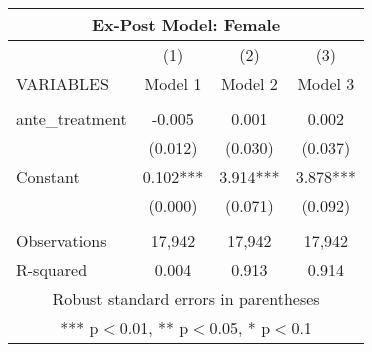 \begin{tabular}{lccc}
\multicolumn{4}{c}{Ex-Post Model: Female} \\ \hline
 & (1) & (2) & (3) \\
VARIABLES & Model 1 & Model 2 & Model 3 \\ \hline
 &  &  &  \\
ante\_treatment & -0.005 & 0.001 & 0.002 \\
 & (0.012) & (0.030) & (0.037) \\
Constant & 0.102*** & 3.914*** & 3.878*** \\
 & (0.000) & (0.071) & (0.092) \\
 &  &  &  \\
Observations & 17,942 & 17,942 & 17,942 \\
 R-squared & 0.004 & 0.913 & 0.914 \\ \hline
\multicolumn{4}{c}{ Robust standard errors in parentheses} \\
\multicolumn{4}{c}{ *** p$<$0.01, ** p$<$0.05, * p$<$0.1} \\
\end{tabular}

